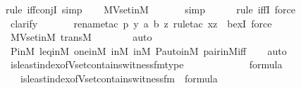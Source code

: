 \begin{isabellebody}
{\isacharparenleft}{\kern0pt}rule\ iff{\isacharunderscore}{\kern0pt}conjI{}{\isacharcomma}{\kern0pt}\ simp{\isacharparenright}{\kern0pt}{\isacharplus}{\kern0pt}\isanewline
\ \ \isamarkupfalse%
\ MVset{\isacharunderscore}{\kern0pt}in{\isacharunderscore}{\kern0pt}M\isanewline
\ \ \ \ \ \isamarkupfalse%
\ simp\isanewline
\ \ \ \ \ \isamarkupfalse%
{\isacharparenleft}{\kern0pt}rule\ iffI{\isacharcomma}{\kern0pt}\ force{\isacharparenright}{\kern0pt}\isanewline
\ \ \ \ \ \isamarkupfalse%
\ clarify\ \isanewline
\ \ \ \ \ \isamarkupfalse%
{\isacharparenleft}{\kern0pt}rename{\isacharunderscore}{\kern0pt}tac\ p\ y\ a\ b\ z{\isacharcomma}{\kern0pt}\ rule{\isacharunderscore}{\kern0pt}tac\ x{\isacharequal}{\kern0pt}z\ \ bexI{\isacharcomma}{\kern0pt}\ force{\isacharparenright}{\kern0pt}\isanewline
\ \ \isamarkupfalse%
\ MVset{\isacharunderscore}{\kern0pt}in{\isacharunderscore}{\kern0pt}M\ transM\ \isanewline
\ \ \ \ \ \isamarkupfalse%
\ auto{\isacharbrackleft}{\kern0pt}{}{\isacharbrackright}{\kern0pt}\isanewline
\ \ \isamarkupfalse%
\ P{\isacharunderscore}{\kern0pt}in{\isacharunderscore}{\kern0pt}M\ leq{\isacharunderscore}{\kern0pt}in{\isacharunderscore}{\kern0pt}M\ one{\isacharunderscore}{\kern0pt}in{\isacharunderscore}{\kern0pt}M\ {\isasymF}{\isacharunderscore}{\kern0pt}in{\isacharunderscore}{\kern0pt}M\ {\isasymG}{\isacharunderscore}{\kern0pt}in{\isacharunderscore}{\kern0pt}M\ P{\isacharunderscore}{\kern0pt}auto{\isacharunderscore}{\kern0pt}in{\isacharunderscore}{\kern0pt}M\ pair{\isacharunderscore}{\kern0pt}in{\isacharunderscore}{\kern0pt}M{\isacharunderscore}{\kern0pt}iff\isanewline
\ \ \isamarkupfalse%
\ auto%
\endisatagproof
{\isafoldproof}%
%
\isadelimproof
\isanewline
%
\endisadelimproof
\isanewline
{}\isamarkupfalse%
\ is{\isacharunderscore}{\kern0pt}least{\isacharunderscore}{\kern0pt}index{\isacharunderscore}{\kern0pt}of{\isacharunderscore}{\kern0pt}Vset{\isacharunderscore}{\kern0pt}contains{\isacharunderscore}{\kern0pt}witness{\isacharunderscore}{\kern0pt}fm{\isacharunderscore}{\kern0pt}type\ {\isacharcolon}{\kern0pt}\ \isanewline
\ \ \ {\isasymphi}\ \ \isanewline
\ \ \ {\isachardoublequoteopen}{\isasymphi}\ {\isasymin}\ formula{\isachardoublequoteclose}\isanewline
\ \ \ {\isachardoublequoteopen}is{\isacharunderscore}{\kern0pt}least{\isacharunderscore}{\kern0pt}index{\isacharunderscore}{\kern0pt}of{\isacharunderscore}{\kern0pt}Vset{\isacharunderscore}{\kern0pt}contains{\isacharunderscore}{\kern0pt}witness{\isacharunderscore}{\kern0pt}fm{\isacharparenleft}{\kern0pt}{\isasymphi}{\isacharparenright}{\kern0pt}\ {\isasymin}\ formula{\isachardoublequoteclose}\ \isanewline

\end{isabellebody}
